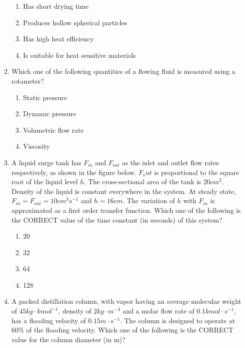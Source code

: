 \documentclass[journal,12pt,onecolumn]{IEEEtran}
\theoremstyle{remark}
\begin{document}
\begin{enumerate}
\hfill{}
\begin{enumerate}
    \item Has short drying time
    \item Produces hollow spherical particles
    \item Has high heat efficiency
    \item Is suitable for heat sensitive materials
\end{enumerate}

    \item Which one of the following quantities of a flowing fluid is measured using a rotameter?

\hfill{}
\begin{enumerate}
    \item Static pressure
    \item Dynamic pressure
    \item Volumetric flow rate
    \item Viscosity
\end{enumerate}

    \item A liquid surge tank has $F_{in}$ and $F_{out}$ as the inlet and outlet flow rates respectively, as shown in the figure below. $F_out$ is proportional to the square root of the liquid level $h$. The cross-sectional area of the tank is $20cm^{2}$. Density of the liquid is constant everywhere in the system. At steady state,$F_{in} = F_{out} = 10cm^{3}s^{-1}$ and $h = 16cm$. The variation of $h$ with $F_{in}$ is approximated as a first order transfer function. Which one of the following is the CORRECT value of the time constant (in seconds) of this system?

\hfill{}

\begin{enumerate}
    \item 20
    \item 32
    \item 64
    \item 128
\end{enumerate}

    \item A packed distillation column, with vapor having an average molecular weight of $45 kg\cdot kmol^{-1}$, density of $2kg\cdot m^{-3}$ and a molar flow rate of $0.1 kmol\cdot s^{-1}$, has a flooding velocity of $0.15m\cdot s^{-1}$. The column is designed to operate at 60\% of the flooding velocity. Which one of the following is the CORRECT value for the column diameter (in m)?
    

\end{enumerate}
\end{document}
